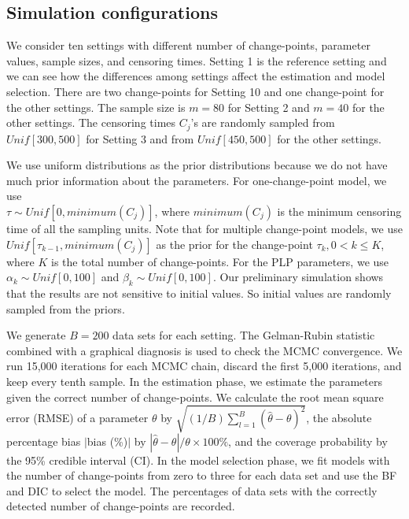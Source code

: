 \documentclass[12pt]{article}
\numberwithin{equation}{section}
\begin{document}
\subsection{Simulation configurations}
We consider ten settings with different number of change-points, parameter values, sample sizes, and censoring times. Setting 1 is the reference setting and we can see how the differences among settings affect the estimation and model selection. There are two change-points for Setting 10 and one change-point for the other settings. The sample size is $m = 80$ for Setting 2 and $m = 40$ for the other settings. The censoring times $C_j$'s are randomly sampled from $Unif[300, 500]$ for Setting 3 and from $Unif[450, 500]$ for the other settings.  

We use uniform distributions as the prior distributions because we do not have much prior information about the parameters. For one-change-point model, we use\\ $\tau\sim Unif[0, minimum(C_j)]$, where $minimum(C_j)$ is the minimum censoring time of all the sampling units. Note that for multiple change-point models, we use $Unif[\tau_{k-1}, minimum(C_j)]$ as the prior for the change-point $\tau_{k}, 0<k\leq K$, where $K$ is the total number of change-points.
For the PLP parameters, we use $\alpha_k\sim Unif[0,100]$ and $\beta_k\sim Unif[0,100]$. Our preliminary simulation shows that the results are not sensitive to initial values. So initial values are randomly sampled from the priors.

We generate $B = 200$ data sets for each setting. The Gelman-Rubin statistic \citep{Gelman1992} combined with a graphical diagnosis is used to check the MCMC convergence. We run 15,000 iterations for each MCMC chain, discard the first 5,000 iterations, and keep every tenth sample. In the estimation phase, we estimate the parameters given the correct number of change-points. We calculate the root mean square error (RMSE) of a parameter $\theta$ by
$\sqrt{(1/B)\sum\limits_{l=1}^{B}(\widehat{\theta}-\theta)^2}$, the absolute percentage bias  $|$bias (\%)$|$ by $|\widehat{\theta}-\theta|/\theta\times 100\%$, and the coverage probability by the 95\% credible interval (CI). In the model selection phase, we fit models with the number of change-points from zero to three for each data set and use the BF and DIC to select the model. The percentages of data sets with the correctly detected number of change-points are recorded. 
\end{document}
